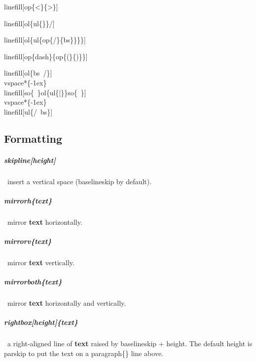 \documentclass[english,12pt,openany,letterpaper]{book}
\begin{document}
\skipline

\bs linefill[\bs op\{<\}\{>\}]

\linefill[\op{<}{>}]

\skipline

\bs linefill[\bs ol\{\bs ul\{\tld\}\}/]

\linefill[\ol{\ul{~}}/]

\skipline

\bs linefill[\bs ol\{\bs ul\{\bs op\{/\}\{\bs bs\}\}\}\}]

\linefill[{\ol{\ul{\op{/}{\bs}}}}]

\skipline

\bs linefill[\bs op\{\bs dash\}\{\bs op\{(\}\{)\}\}]

\linefill[\op{\dash}{\op{(}{)}}]

\skipline

\bs linefill[\bs ol\{\bs bs\bs\ /\}]\\
\bs vspace*\{-1ex\}\\
\bs linefill[\bs so\{\bs\ \}\bs ol\{\bs ul\{|\}\}\bs so\{\bs\ \}]\\
\bs vspace*\{-1ex\}\\
\bs linefill[\bs ul\{/\bs \ \bs bs\}]\\

\linefill[\ol{\bs\ /}]
\vspace*{-1ex}
\linefill[\so{\ }\ol{\ul{|}}\so{\ }]
\vspace*{-1ex}
\linefill[\ul{/\ \bs}]

\vfill
\break


\subsection{Formatting}

\subparagraph{\bs skipline[height]} \dash\ insert a vertical space (\bs baselineskip by default).

\skipline

\subparagraph{\bs mirrorh\{text\}} \dash\ mirror \textbf{text} horizontally.

\subparagraph{\bs mirrorv\{text\}} \dash\ mirror \textbf{text} vertically.

\subparagraph{\bs mirrorboth\{text\}} \dash\ mirror \textbf{text} horizontally and vertically.

\skipline

\subparagraph{\bs rightbox[height]\{text\}} \dash\ a right-aligned line of  \textbf{text} raised by \bs baselineskip + height. The default height is \bs parskip to put the text on a \bs paragraph\{\} line above.
\end{document}
